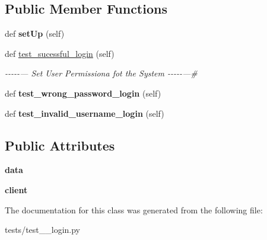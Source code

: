 \subsection*{Public Member Functions}
\begin{DoxyCompactItemize}
\item 
\mbox{\label{classtests_1_1test__5__login_1_1_test_user_routes_a1a60e73e587ad1e24703d02c913dab0a}} 
def {\bfseries set\+Up} (self)
\item 
\mbox{\label{classtests_1_1test__5__login_1_1_test_user_routes_af73cbbcc4c437f887f38969205fc0978}} 
def \hyperlink{classtests_1_1test__5__login_1_1_test_user_routes_af73cbbcc4c437f887f38969205fc0978}{test\+\_\+sucessful\+\_\+login} (self)
\begin{DoxyCompactList}\small\item\em -\/-\/-\/-\/-\/--- Set User Permissiona fot the System -\/-\/-\/-\/-\/---\# \end{DoxyCompactList}\item 
\mbox{\label{classtests_1_1test__5__login_1_1_test_user_routes_ac6b4bf9ad5f166d1cdcd371801c5371d}} 
def {\bfseries test\+\_\+wrong\+\_\+password\+\_\+login} (self)
\item 
\mbox{\label{classtests_1_1test__5__login_1_1_test_user_routes_a5d043d579b6f8497191d239cfc78b900}} 
def {\bfseries test\+\_\+invalid\+\_\+username\+\_\+login} (self)
\end{DoxyCompactItemize}
\subsection*{Public Attributes}
\begin{DoxyCompactItemize}
\item 
\mbox{\label{classtests_1_1test__5__login_1_1_test_user_routes_a717c6e8d6b4f325eb2bb6209a5c8dc1b}} 
{\bfseries data}
\item 
\mbox{\label{classtests_1_1test__5__login_1_1_test_user_routes_a1a2cbaae1a6bb07d1f25e5c4ea1b54e1}} 
{\bfseries client}
\end{DoxyCompactItemize}


The documentation for this class was generated from the following file\+:\begin{DoxyCompactItemize}
\item 
tests/test\+\_\+\_\+login.\+py\end{DoxyCompactItemize}
